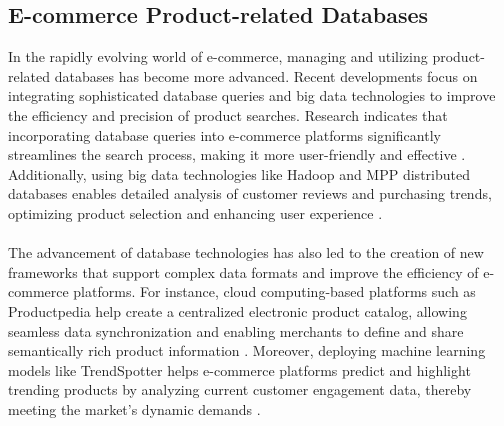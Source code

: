 \subsection*{E-commerce Product-related Databases}
In the rapidly evolving world of e-commerce, managing and utilizing product-related databases has become more advanced. Recent developments focus on integrating sophisticated database queries and big data technologies to improve the efficiency and precision of product searches. Research indicates that incorporating database queries into e-commerce platforms significantly streamlines the search process, making it more user-friendly and effective \cite{Muntjir2016}. Additionally, using big data technologies like Hadoop and MPP distributed databases enables detailed analysis of customer reviews and purchasing trends, optimizing product selection and enhancing user experience \cite{Liang_2020}.
\\\\
The advancement of database technologies has also led to the creation of new frameworks that support complex data formats and improve the efficiency of e-commerce platforms. For instance, cloud computing-based platforms such as Productpedia help create a centralized electronic product catalog, allowing seamless data synchronization and enabling merchants to define and share semantically rich product information \cite{10.1007/978-3-319-20895-4_34}. Moreover, deploying machine learning models like TrendSpotter helps e-commerce platforms predict and highlight trending products by analyzing current customer engagement data, thereby meeting the market's dynamic demands \cite{10.1145/3583780.3615503}.